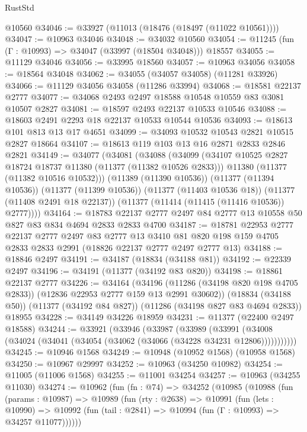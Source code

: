 \begin{lexlean}{RustStd}
\begin{coremodule}
    @10560
@34046 := @33927 (@11013 (@18476 (@18497 (@11022 @10561))))
@34047 := @10963 @34046
@34048 := @34032 @10560
@34054 := @11245 (fun (Γ : @10993) => @34047 (@33997 (@18504 @34048))) @18557
@34055 := @11129 @34046
@34056 := @33995 @18560
@34057 := @10963 @34056
@34058 := @18564 @34048
@34062 := @34055 (@34057 @34058) (@11281 @33926)
@34066 := @11129 @34056 @34058 (@11286 @33994)
@34068 := @18581 @22137 @2777
@34077 := @34068 @2493 @2497 @18588 @10548 @10559 @83 @3081 @10507 @2827
@34081 := @18597 @2493 @22137 @10533 @10546
@34088 := @18603 @2491 @2293 @18 @22137 @10533 @10544 @10536
@34093 := @18613 @101 @813 @13 @17 @4651
@34099 := @34093 @10532 @10543 @2821 @10515 @2827 @18664
@34107 := @18613 @119 @103 @13 @16 @2871 @2833 @2846 @2821
@34149 := @34077
    (@34081
      (@34088
        (@34099
          (@34107 @10525 @2827 @18724 @18737 @11380 (@11377 (@11382 @10526 @2833)))
          @11380
          (@11377 (@11382 @10516 @10532)))
        (@11389 (@11390 @10536))
        (@11377 (@11394 @10536))
        (@11377 (@11399 @10536))
        (@11377 (@11403 @10536 @18))
        (@11377 (@11408 @2491 @18 @22137))
        (@11377 (@11414 (@11415 (@11416 @10536)) @2777))))
@34164 := @18783 @22137 @2777 @2497 @84 @2777 @13 @10558 @50 @827 @83 @834 @4694 @2833 @2833 @4700
@34187 := @18781
    @22953
    @2777
    @22137
    @2777
    @2497
    @83
    @2777
    @13
    @3410
    @81
    @820
    @198
    @159
    @4705
    @2833
    @2833
    @2991
    (@18826 @22137 @2777 @2497 @2777 @13)
@34188 := @18846 @2497
@34191 := @34187 (@18834 (@34188 @81))
@34192 := @22339 @2497
@34196 := @34191 (@11377 (@34192 @83 @820))
@34198 := @18861 @22137 @2777
@34226 := @34164
    (@34196 (@11286 (@34198 @820 @198 @4705 @2833)) (@12836 @22953 @2777 @159 @13 @2991 @30602))
    (@18834 (@34188 @50))
    (@11377 (@34192 @84 @827))
    (@11286 (@34198 @827 @83 @4694 @2833))
    @18955
@34228 := @34149 @34226 @18959
@34231 := @11377 (@22400 @2497 @18588)
@34244 := @33921
    (@33946
      (@33987
        (@33989
          (@33991 (@34008 (@34024 (@34041 (@34054 (@34062 (@34066 (@34228 @34231 @12806)))))))))))
@34245 := @10946 @1568
@34249 := @10948 (@10952 @1568) (@10958 @1568)
@34250 := @10967 @29997
@34252 := @10963 (@34250 @10982)
@34254 := @11005 (@11006 @1568)
@34255 := @11001 @34254
@34257 := @10963 (@34255 @11030)
@34274 := @10962
    (fun (fn : @74) =>
    @34252
      (@10985
        (@10988
          (fun (params : @10987) =>
          @10989
            (fun (rty : @2638) =>
            @10991
              (fun (lets : @10990) =>
              @10992 (fun (tail : @2841) => @10994 (fun (Γ : @10993) => @34257 @11077))))))

\end{coremodule}
\end{lexlean}
